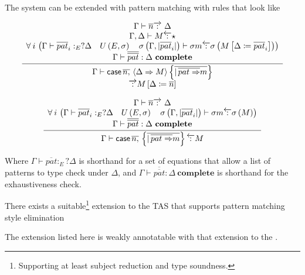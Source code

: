 The \bidir{} system can be extended with pattern matching with rules that look like 

\[
\frac{\begin{array}{c}
\Gamma\vdash\overline{n}\overrightarrow{\,:\,}\ \Delta\\
\Gamma,\Delta\vdash M\overleftarrow{\,:\,}\star\\
\forall\:i\,\left(\Gamma\vdash\overline{pat}_{i}:_{E}?\Delta\quad U\left(E,\sigma\right)\quad\sigma\left(\Gamma,|\overline{pat}_{i}|\right)\vdash\sigma m\overleftarrow{\,:\,}\sigma\left(M\left[\Delta\coloneqq\overline{pat}_{i}\right]\right)\right)\\
\Gamma\vdash\overline{\overline{pat}}:\Delta\ \mathbf{complete}
\end{array}}{\begin{array}{c}
\Gamma\vdash \mathsf{case}{} \,\overline{n,}\,\left\langle \Delta \Rightarrow M\right\rangle \left\{ \overline{|\,\overline{pat\Rightarrow}m}\right\} \\
\overrightarrow{\,:\,}M\left[\Delta \coloneqq\overline{n}\right]
\end{array}}
\]


\[
\frac{\begin{array}{c}
\Gamma\vdash\overline{n}\overrightarrow{\,:\,}\ \Delta\\
\forall\:i\,\left(\Gamma\vdash\overline{pat}_{i}:_{E}?\Delta\quad U\left(E,\sigma\right)\quad\sigma\left(\Gamma,|\overline{pat}_{i}|\right)\vdash\sigma m\overleftarrow{\,:\,}\sigma\left(M\right)\right)\\
\Gamma\vdash\overline{\overline{pat}}:\Delta\ \mathbf{complete}
\end{array}}{\Gamma\vdash \mathsf{case}{} \,\overline{n,}\,\left\{ \overline{|\,\overline{pat\Rightarrow}m}\right\} \overleftarrow{\,:\,}M}
\]

Where $\Gamma\vdash\overline{pat}:_{E}?\Delta$ is shorthand for a set of equations that allow a list of patterns to type check under $\Delta$, 
  and $\Gamma\vdash\overline{\overline{pat}}:\Delta\ \mathbf{complete}$ is shorthand for the exhaustiveness check. 
\begin{conjecture}
There exists a suitable\footnote{
  Supporting at least subject reduction and type soundness. %
} extension to the \slang{} \ac{TAS} that supports pattern matching style elimination
\end{conjecture}

\begin{conjecture}
The \bidir{} extension listed here is weakly annotatable with that extension to the \slang{}.
\end{conjecture}
 
